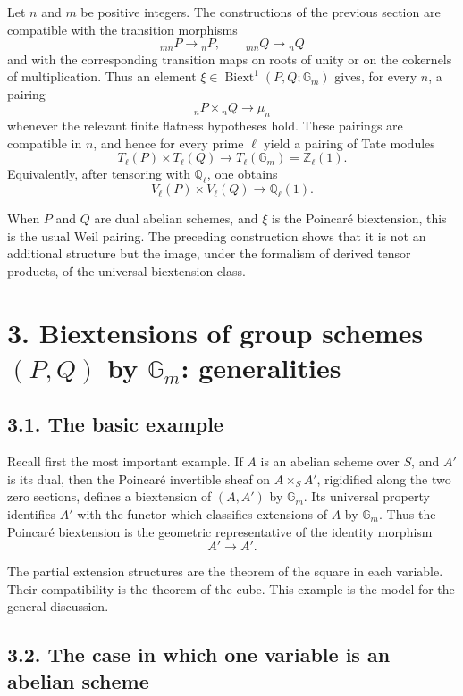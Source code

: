 \documentclass[11pt]{article}
\newcommand{\bZ}{\mathbb Z}
\newcommand{\bQ}{\mathbb Q}
\newcommand{\Gm}{\mathbb G_m}
\newcommand{\Biext}{\operatorname{Biext}}
\begin{document}
Let \(n\) and \(m\) be positive integers. The constructions of the previous
section are compatible with the transition morphisms
\[
{}_{mn}P\longrightarrow {}_nP,\qquad {}_{mn}Q\longrightarrow {}_nQ
\]
and with the corresponding transition maps on roots of unity or on the
cokernels of multiplication. Thus an element
\(\xi\in\Biext^1(P,Q;\Gm)\) gives, for every \(n\), a pairing
\[
{}_nP\times {}_nQ\longrightarrow \mu_n
\]
whenever the relevant finite flatness hypotheses hold. These pairings are
compatible in \(n\), and hence for every prime \(\ell\) yield a pairing of Tate
modules
\[
T_\ell(P)\times T_\ell(Q)\longrightarrow T_\ell(\Gm)=\bZ_\ell(1).
\]
Equivalently, after tensoring with \(\bQ_\ell\), one obtains
\[
V_\ell(P)\times V_\ell(Q)\longrightarrow \bQ_\ell(1).
\]

When \(P\) and \(Q\) are dual abelian schemes, and \(\xi\) is the Poincaré
biextension, this is the usual Weil pairing. The preceding construction shows
that it is not an additional structure but the image, under the formalism of
derived tensor products, of the universal biextension class.

\section*{3. Biextensions of group schemes \((P,Q)\) by \(\Gm\): generalities}

\subsection*{3.1. The basic example}

Recall first the most important example. If \(A\) is an abelian scheme over
\(S\), and \(A'\) is its dual, then the Poincaré invertible sheaf on
\(A\times_S A'\), rigidified along the two zero sections, defines a biextension
of \((A,A')\) by \(\Gm\). Its universal property identifies \(A'\) with the
functor which classifies extensions of \(A\) by \(\Gm\). Thus the Poincaré
biextension is the geometric representative of the identity morphism
\[
A'\longrightarrow A'.
\]

The partial extension structures are the theorem of the square in each variable.
Their compatibility is the theorem of the cube. This example is the model for the
general discussion.

\subsection*{3.2. The case in which one variable is an abelian scheme}
\end{document}
